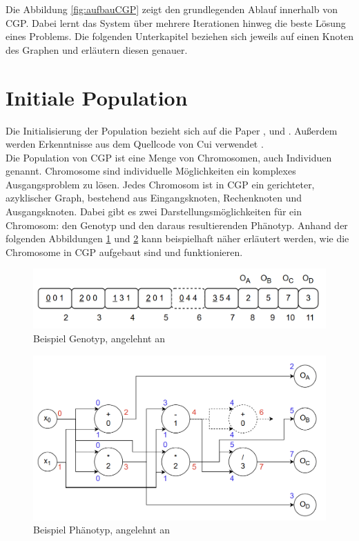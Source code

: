 Die Abbildung \ref{fig:aufbauCGP} zeigt den grundlegenden Ablauf innerhalb von CGP.
Dabei lernt das System über mehrere Iterationen hinweg die beste Lösung eines Problems.
Die folgenden Unterkapitel beziehen sich jeweils auf einen Knoten des Graphen und erläutern diesen genauer.


\section{Initiale Population}
\label{sec:initialePopulation}
Die Initialisierung der Population bezieht sich auf die Paper \cite{miller_cartesian_2020}, \cite{torabi_using_2022} und \cite{milad_taleby_ahvanooey_survey_2019}.
Außerdem werden Erkenntnisse aus dem Quellcode von Cui verwendet \cite{cuihen_cuihencgp_with_crossover_strategies_2024}.\\
Die Population von CGP ist eine Menge von Chromosomen, auch Individuen genannt.
Chromosome sind individuelle Möglichkeiten ein komplexes Ausgangsproblem zu lösen.
Jedes Chromosom ist in CGP ein gerichteter, azyklischer Graph, bestehend aus Eingangsknoten, Rechenknoten und Ausgangsknoten.
Dabei gibt es zwei Darstellungsmöglichkeiten für ein Chromosom: den Genotyp und den daraus resultierenden Phänotyp.
Anhand der folgenden Abbildungen \ref{fig:genotypNeu} und \ref{fig:phänotyp} kann beispielhaft näher erläutert werden, wie die Chromosome in CGP aufgebaut sind und funktionieren.

\begin{figure}[H]
    \centering
    \includegraphics[scale = 0.45]{Bilder/TorabiBeispielGenotypNeu.png}
    \caption{Beispiel Genotyp, angelehnt an \cite{torabi_using_2022}}
    \label{fig:genotypNeu}
\end{figure}
\begin{figure}[H]
    \includegraphics[scale = 0.45]{Bilder/BeispielChromosom.png}
    \caption{Beispiel Phänotyp, angelehnt an \cite{torabi_using_2022}}
    \label{fig:phänotyp}
\end{figure}


